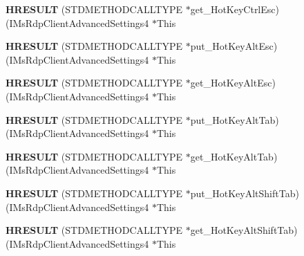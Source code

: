 \begin{DoxyCompactItemize}
{\bfseries H\+R\+E\+S\+U\+LT} (S\+T\+D\+M\+E\+T\+H\+O\+D\+C\+A\+L\+L\+T\+Y\+PE $\ast$get\+\_\+\+Hot\+Key\+Ctrl\+Esc)(I\+Ms\+Rdp\+Client\+Advanced\+Settings4 $\ast$This
\item 
\mbox{\label{struct_i_ms_rdp_client_advanced_settings4_vtbl_a3e6b94f459df36573e6b63bb4a8a4b6f}} 
{\bfseries H\+R\+E\+S\+U\+LT} (S\+T\+D\+M\+E\+T\+H\+O\+D\+C\+A\+L\+L\+T\+Y\+PE $\ast$put\+\_\+\+Hot\+Key\+Alt\+Esc)(I\+Ms\+Rdp\+Client\+Advanced\+Settings4 $\ast$This
\item 
\mbox{\label{struct_i_ms_rdp_client_advanced_settings4_vtbl_af3012e8ca8eee05dbe3f60b987943bc2}} 
{\bfseries H\+R\+E\+S\+U\+LT} (S\+T\+D\+M\+E\+T\+H\+O\+D\+C\+A\+L\+L\+T\+Y\+PE $\ast$get\+\_\+\+Hot\+Key\+Alt\+Esc)(I\+Ms\+Rdp\+Client\+Advanced\+Settings4 $\ast$This
\item 
\mbox{\label{struct_i_ms_rdp_client_advanced_settings4_vtbl_a04aa959bedb8266dab9941ffc274e1fa}} 
{\bfseries H\+R\+E\+S\+U\+LT} (S\+T\+D\+M\+E\+T\+H\+O\+D\+C\+A\+L\+L\+T\+Y\+PE $\ast$put\+\_\+\+Hot\+Key\+Alt\+Tab)(I\+Ms\+Rdp\+Client\+Advanced\+Settings4 $\ast$This
\item 
\mbox{\label{struct_i_ms_rdp_client_advanced_settings4_vtbl_a90b7a7b7719c76cacbe1d15a32dc956f}} 
{\bfseries H\+R\+E\+S\+U\+LT} (S\+T\+D\+M\+E\+T\+H\+O\+D\+C\+A\+L\+L\+T\+Y\+PE $\ast$get\+\_\+\+Hot\+Key\+Alt\+Tab)(I\+Ms\+Rdp\+Client\+Advanced\+Settings4 $\ast$This
\item 
\mbox{\label{struct_i_ms_rdp_client_advanced_settings4_vtbl_af1e569d93c183fad04872a33a8872bca}} 
{\bfseries H\+R\+E\+S\+U\+LT} (S\+T\+D\+M\+E\+T\+H\+O\+D\+C\+A\+L\+L\+T\+Y\+PE $\ast$put\+\_\+\+Hot\+Key\+Alt\+Shift\+Tab)(I\+Ms\+Rdp\+Client\+Advanced\+Settings4 $\ast$This
\item 
\mbox{\label{struct_i_ms_rdp_client_advanced_settings4_vtbl_ad4c3cb8017811f9139c5b3ee61abc3e3}} 
{\bfseries H\+R\+E\+S\+U\+LT} (S\+T\+D\+M\+E\+T\+H\+O\+D\+C\+A\+L\+L\+T\+Y\+PE $\ast$get\+\_\+\+Hot\+Key\+Alt\+Shift\+Tab)(I\+Ms\+Rdp\+Client\+Advanced\+Settings4 $\ast$This

\end{DoxyCompactItemize}
